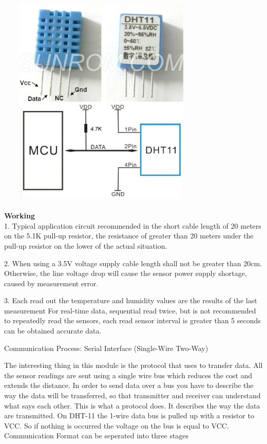 \documentclass[11pt]{report}
\begin{document}
	  \includegraphics[width=10cm,height=10cm,keepaspectratio]{dht11.jpg}\\\\
	
	 
	 \textbf{Working}
	 \\
	 
	 1. Typical application circuit recommended in the short cable length of 20 meters on the 5.1K pull-up resistor, the resistance of greater than 20 meters under the pull-up resistor on the lower of the actual situation.
	 
	 2. When using a 3.5V voltage supply cable length shall not be greater than 20cm. Otherwise, the line voltage drop will cause the sensor power supply shortage, caused by measurement error.
	 
	 3. Each read out the temperature and humidity values are the results of the last measurement For real-time data, sequential read twice, but is not recommended to repeatedly read the sensors, each read sensor interval is greater than 5 seconds can be obtained accurate data.
	 
	 Communication Process: Serial Interface (Single-Wire Two-Way)
	 
	 The interesting thing in this module is the protocol that uses to transfer data. All the sensor readings are sent using a single wire bus which reduces the cost and extends the distance. In order to send data over a bus you have to describe the way the data will be transferred, so that transmitter and receiver can understand what says each other. This is what a protocol does. It describes the way the data are transmitted. On DHT-11 the 1-wire data bus is pulled up with a resistor to VCC. So if nothing is occurred the voltage on the bus is equal to VCC. Communication Format can be seperated into three stages
	 
\end{document}

